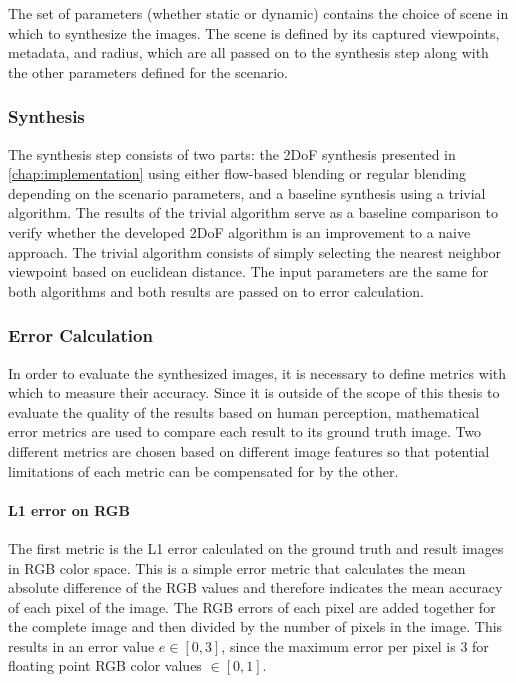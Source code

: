 The set of parameters (whether static or dynamic) contains the choice of scene in which to synthesize the images. The scene is defined by its captured viewpoints, metadata, and radius, which are all passed on to the synthesis step along with the other parameters defined for the scenario.

\subsubsection{Synthesis}
The synthesis step consists of two parts: the 2DoF synthesis presented in \ref{chap:implementation} using either flow-based blending or regular blending depending on the scenario parameters, and a baseline synthesis using a trivial algorithm. The results of the trivial algorithm serve as a baseline comparison to verify whether the developed 2DoF algorithm is an improvement to a naive approach. The trivial algorithm consists of simply selecting the nearest neighbor viewpoint based on euclidean distance. The input parameters are the same for both algorithms and both results are passed on to error calculation.

\subsubsection{Error Calculation}
In order to evaluate the synthesized images, it is necessary to define metrics with which to measure their accuracy. Since it is outside of the scope of this thesis to evaluate the quality of the results based on human perception, mathematical error metrics are used to compare each result to its ground truth image. Two different metrics are chosen based on different image features so that potential limitations of each metric can be compensated for by the other.

\paragraph{L1 error on RGB}
The first metric is the L1 error calculated on the ground truth and result images in RGB color space. This is a simple error metric that calculates the mean absolute difference of the RGB values and therefore indicates the mean accuracy of each pixel of the image. The RGB errors of each pixel are added together for the complete image and then divided by the number of pixels in the image. This results in an error value $e \in [0,3]$, since the maximum error per pixel is 3 for floating point RGB color values $\in [0,1]$.


